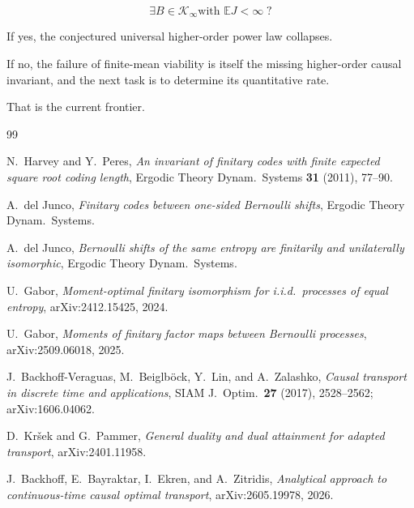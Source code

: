 \documentclass[11pt,a4paper]{article}
\newcommand{\E}{\mathbb E}
\newcommand{\cK}{\mathcal K}
\begin{document}
\[
\boxed{
\exists B\in\cK_\infty
\text{with }
\E J<\infty
\;?
}
\]

If yes, the conjectured universal higher-order power law collapses.

If no, the failure of finite-mean viability is itself the missing
higher-order causal invariant, and the next task is to determine its
quantitative rate.

That is the current frontier.

\begin{thebibliography}{99}

N.~Harvey and Y.~Peres,
\emph{An invariant of finitary codes with finite expected square root coding length},
Ergodic Theory Dynam.\ Systems \textbf{31} (2011), 77--90.

A.~del Junco,
\emph{Finitary codes between one-sided Bernoulli shifts},
Ergodic Theory Dynam.\ Systems.

A.~del Junco,
\emph{Bernoulli shifts of the same entropy are finitarily and unilaterally isomorphic},
Ergodic Theory Dynam.\ Systems.

U.~Gabor,
\emph{Moment-optimal finitary isomorphism for i.i.d.\ processes of equal entropy},
arXiv:2412.15425, 2024.

U.~Gabor,
\emph{Moments of finitary factor maps between Bernoulli processes},
arXiv:2509.06018, 2025.

J.~Backhoff-Veraguas, M.~Beiglb\"ock, Y.~Lin, and A.~Zalashko,
\emph{Causal transport in discrete time and applications},
SIAM J.\ Optim.\ \textbf{27} (2017), 2528--2562;
arXiv:1606.04062.

D.~Kr\v{s}ek and G.~Pammer,
\emph{General duality and dual attainment for adapted transport},
arXiv:2401.11958.

J.~Backhoff, E.~Bayraktar, I.~Ekren, and A.~Zitridis,
\emph{Analytical approach to continuous-time causal optimal transport},
arXiv:2605.19978, 2026.

\end{thebibliography}
\end{document}
